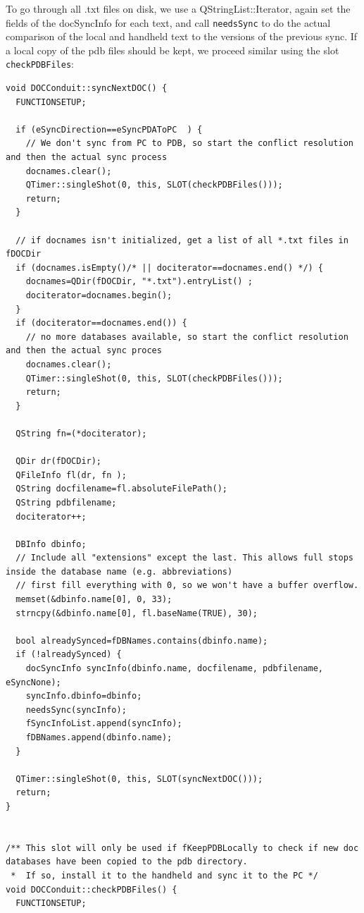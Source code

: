 \documentclass[10pt,a4paper]{article}
\newcommand{\code}[1]{{\small\texttt{#1}}}
\begin{document}
To go through all .txt files on disk, we use a QStringList::Iterator, again set the fields of the docSyncInfo for each text, and call \code{needsSync} to do the actual comparison of the local and handheld text to the versions of the previous sync. If a local copy of the pdb files should be kept, we proceed similar using the slot \code{checkPDBFiles}:

{\footnotesize
\begin{verbatim}
void DOCConduit::syncNextDOC() {
  FUNCTIONSETUP;
  
  if (eSyncDirection==eSyncPDAToPC  ) {
    // We don't sync from PC to PDB, so start the conflict resolution and then the actual sync process
    docnames.clear();
    QTimer::singleShot(0, this, SLOT(checkPDBFiles()));
    return;
  }
  
  // if docnames isn't initialized, get a list of all *.txt files in fDOCDir
  if (docnames.isEmpty()/* || dociterator==docnames.end() */) {
    docnames=QDir(fDOCDir, "*.txt").entryList() ;
    dociterator=docnames.begin();
  }
  if (dociterator==docnames.end()) {
    // no more databases available, so start the conflict resolution and then the actual sync proces
    docnames.clear();
    QTimer::singleShot(0, this, SLOT(checkPDBFiles()));
    return;
  }

  QString fn=(*dociterator);

  QDir dr(fDOCDir);
  QFileInfo fl(dr, fn );
  QString docfilename=fl.absoluteFilePath();
  QString pdbfilename;
  dociterator++;
  
  DBInfo dbinfo;
  // Include all "extensions" except the last. This allows full stops inside the database name (e.g. abbreviations)
  // first fill everything with 0, so we won't have a buffer overflow.
  memset(&dbinfo.name[0], 0, 33);
  strncpy(&dbinfo.name[0], fl.baseName(TRUE), 30);

  bool alreadySynced=fDBNames.contains(dbinfo.name);
  if (!alreadySynced) {
    docSyncInfo syncInfo(dbinfo.name, docfilename, pdbfilename, eSyncNone);
    syncInfo.dbinfo=dbinfo;
    needsSync(syncInfo);
    fSyncInfoList.append(syncInfo);
    fDBNames.append(dbinfo.name);
  }
  
  QTimer::singleShot(0, this, SLOT(syncNextDOC()));
  return;
}


/** This slot will only be used if fKeepPDBLocally to check if new doc databases have been copied to the pdb directory.
 *  If so, install it to the handheld and sync it to the PC */
void DOCConduit::checkPDBFiles() {
  FUNCTIONSETUP;
  

\end{verbatim}}
\end{document}
